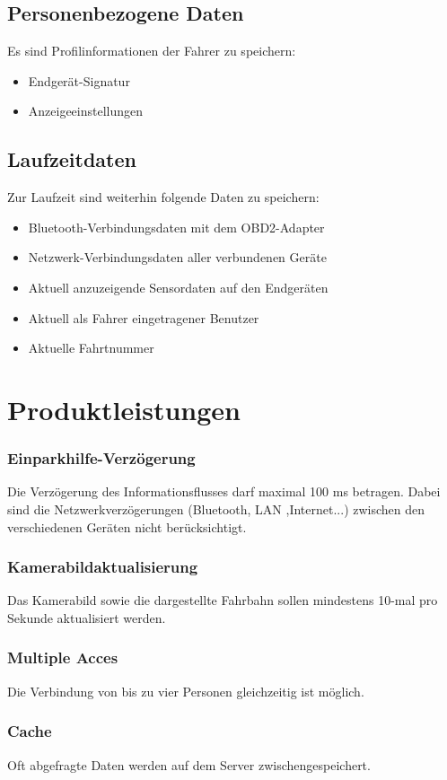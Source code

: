 \documentclass[pflichtenheft.tex]{subfiles}
\begin{document}
\section{\mkd Personenbezogene Daten}
Es sind Profilinformationen der Fahrer zu speichern:
\begin{itemize}
\item
Endgerät-Signatur
\item
Anzeigeeinstellungen

\end{itemize}

\section{\mkd Laufzeitdaten}
Zur Laufzeit sind weiterhin folgende Daten zu speichern:
\begin{itemize}
\item
Bluetooth-Verbindungsdaten mit dem OBD2-Adapter
\item
Netzwerk-Verbindungsdaten aller verbundenen Geräte
\item
Aktuell anzuzeigende Sensordaten auf den Endgeräten
\item
Aktuell als Fahrer eingetragener Benutzer
\item
Aktuelle Fahrtnummer

\end{itemize}



\chapter{Produktleistungen}

\subsection{\mkl Einparkhilfe-Verzögerung}
Die Verzögerung des Informationsflusses darf maximal 100 ms betragen. Dabei sind die Netzwerkverzögerungen (Bluetooth, LAN ,Internet...) zwischen den verschiedenen Geräten nicht berücksichtigt. 

\subsection{\mkl Kamerabildaktualisierung}
Das Kamerabild sowie die dargestellte Fahrbahn sollen mindestens 10-mal pro Sekunde aktualisiert werden.

\subsection{\mkl Multiple Acces} Die Verbindung von bis zu vier Personen gleichzeitig ist möglich.

\subsection{\mkl Cache} Oft abgefragte Daten werden auf dem Server zwischengespeichert.
\end{document}
